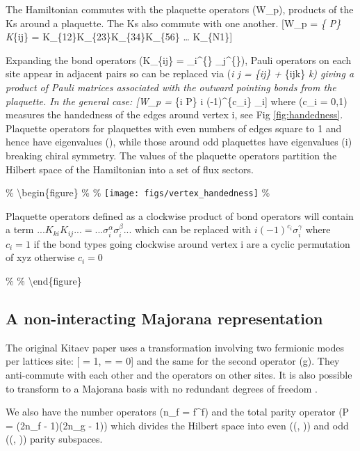 The Hamiltonian commutes with the plaquette operators (W\_p), products
of the Ks around a plaquette. The Ks also commute with one another.
{[}W\_p = \prod\emph{\{ \in P\} K}\{ij\} =
K\_\{12\}K\_\{23\}K\_\{34\}K\_\{56\} \ldots{} K\_\{N1\}{]}

Expanding the bond operators (K\_\{ij\} = \sigma\_i\^{}\{\alpha\}
\sigma\_j\^{}\{\alpha\}), Pauli operators on each site appear in
adjacent pairs so can be replaced via (\sigma\emph{i \sigma\emph{j =
\delta}\{ij\} + \epsilon}\{ijk\} \sigma\emph{k) giving a product of
Pauli matrices associated with the outward pointing bonds from the
plaquette. In the general case: {[}W\_p = \prod}\{i \in P\} i
(-1)\^{}\{c\_i\} \sigma\_i{]} where (c\_i = 0,1) measures the handedness
of the edges around vertex i, see Fig \ref{fig:handedness}. Plaquette
operators for plaquettes with even numbers of edges square to 1 and
hence have eigenvalues (), while those around odd plaquettes have
eigenvalues (\pm i) breaking chiral symmetry. The values of the
plaquette operators partition the Hilbert space of the Hamiltonian into
a set of flux sectors.

\% \textbackslash begin\{figure\} \% \centering \%
\texttt{[image: figs/vertex\_handedness]} \%

\caption{Plaquette operators defined as a clockwise product of bond operators will contain a term \(...K_{ki}K_{ij}... = ...\sigma^\alpha_i \sigma^\beta_i ...\) which can be replaced with \(i (-1)^{c_i} \sigma_i^\gamma\) where \(c_i = 1\) if the bond types going clockwise around vertex i are a cyclic permutation of xyz otherwise \(c_i = 0\)}

\% \label{fig:handedness} \% \textbackslash end\{figure\}

\subsection{A non-interacting Majorana representation}

The original Kitaev paper uses a transformation involving two fermionic
modes per lattices site: {[} = 1,  =
 = 0{]} and the same for the second operator
(g). They anti-commute with each other and the operators on other sites.
It is also possible to transform to a Majorana basis with no redundant
degrees of freedom \cite{fengTopologicalCharacterizationQuantum2007}.

We also have the number operators (n\_f = f\^{}\dagger f) and the total
parity operator (P = (2n\_f - 1)(2n\_g - 1)) which divides the Hilbert
space into even ((, )) and odd ((, ))
parity subspaces.

